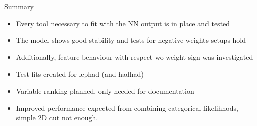 \begin{frame}{Summary}
    \begin{itemize}
        \item Every tool necessary to fit with the NN output is in place and tested 
        \item The model shows good stability and tests for negative weights setups hold
        \item Additionally, feature behaviour with respect wo weight sign was investigated
        \item Test fits created for lephad (and hadhad)
        \item Variable ranking planned, only needed for documentation
        \item Improved performance expected from combining categorical likelihhods, simple 2D cut not enough.
    \end{itemize}
\end{frame}

